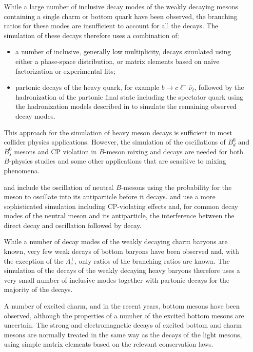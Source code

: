   While a large number of inclusive decay modes of the weakly decaying mesons containing a 
  single charm or bottom quark have been observed, the branching ratios for these modes
  are insufficient to account for all the decays. The simulation of these decays
  therefore uses a combination of:
\begin{itemize}
\item a number of inclusive, generally low multiplicity, decays
      simulated using either a phase-space distribution, or matrix elements based on 
      na\"ive factorization or experimental fits;
\item partonic decays of the heavy quark, for example $b\to c\ell^-\bar\nu_\ell$, followed
      by the hadronization of the partonic final state including the spectator quark
      using the hadronization models described in
       to simulate the remaining observed decay modes.
\end{itemize}
  This approach for the simulation of heavy meson decays 
  is sufficient in most collider physics applications.
  However, the simulation of the oscillations of $B^0_d$ and $B_s^0$ mesons
  and CP violation in $B$-meson mixing and decays are needed for both
  $B$-physics studies and some other applications that are sensitive to 
  mixing phenomena.
  
 \herwigpp and \pythiaeight include the oscillation of neutral
  $B$-mesons using the probability for the meson to oscillate into its antiparticle
  before it decays.
  \sherpa and \evtgen use a more sophisticated simulation including
  CP-violating effects and, for common decay modes of the neutral meson
  and its antiparticle, the interference between the direct decay and
  oscillation followed by decay.

  While a number of decay modes of the weakly decaying charm baryons are known,
  very few weak decays of bottom baryons have been observed and, with the exception
  of the $\Lambda_c^+$, only ratios of the branching ratios are known. The simulation
  of the decays of the weakly decaying heavy baryons therefore uses a 
  very small number of inclusive modes together with partonic decays for
  the majority of the decays.

  A number of excited charm, and in the recent years, bottom mesons
  have been observed, although the properties of a number of the excited
  bottom mesons are uncertain.
  The strong and electromagnetic decays of excited bottom
  and charm mesons are normally
  treated in the same way as the decays of the light mesons, \ie
  using simple matrix elements based on the relevant conservation laws. 

